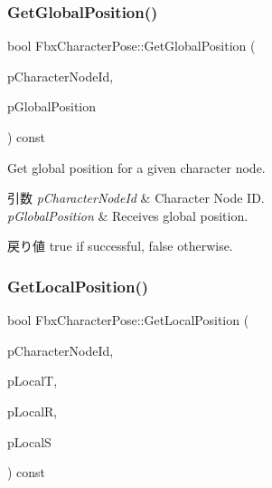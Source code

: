 \subsubsection{\texorpdfstring{Get\+Global\+Position()}{GetGlobalPosition()}}
{\footnotesize\ttfamily bool Fbx\+Character\+Pose\+::\+Get\+Global\+Position (\begin{DoxyParamCaption}\item[{\hyperlink{class_fbx_character_ad75bf42026e435ac0ff4d7ece2317be4}{Fbx\+Character\+::\+E\+Node\+Id}}]{p\+Character\+Node\+Id,  }\item[{\hyperlink{class_fbx_a_matrix}{Fbx\+A\+Matrix} \&}]{p\+Global\+Position }\end{DoxyParamCaption}) const}

Get global position for a given character node. 
\begin{DoxyParams}{引数}
{\em p\+Character\+Node\+Id} & Character Node ID. \\
\hline
{\em p\+Global\+Position} & Receives global position. \\
\hline
\end{DoxyParams}
\begin{DoxyReturn}{戻り値}
{\ttfamily true} if successful, {\ttfamily false} otherwise. 
\end{DoxyReturn}
\mbox{\label{class_fbx_character_pose_ab258febbc8198b6687eaef43654909c5}} 
\subsubsection{\texorpdfstring{Get\+Local\+Position()}{GetLocalPosition()}}
{\footnotesize\ttfamily bool Fbx\+Character\+Pose\+::\+Get\+Local\+Position (\begin{DoxyParamCaption}\item[{\hyperlink{class_fbx_character_ad75bf42026e435ac0ff4d7ece2317be4}{Fbx\+Character\+::\+E\+Node\+Id}}]{p\+Character\+Node\+Id,  }\item[{\hyperlink{class_fbx_vector4}{Fbx\+Vector4} \&}]{p\+LocalT,  }\item[{\hyperlink{class_fbx_vector4}{Fbx\+Vector4} \&}]{p\+LocalR,  }\item[{\hyperlink{class_fbx_vector4}{Fbx\+Vector4} \&}]{p\+LocalS }\end{DoxyParamCaption}) const}

